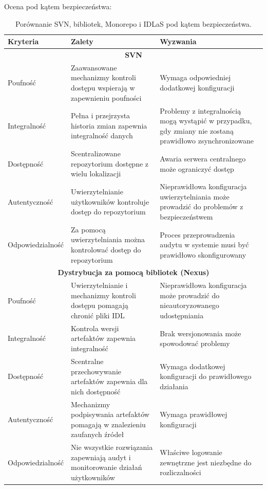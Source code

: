 \documentclass[runningheads,12pt]{llncs}
\begin{document}
Ocena pod kątem bezpieczeństwa:
\begin{longtable}{|p{4cm}|p{4cm}|p{4cm}|}
    \caption{Porównanie SVN, bibliotek, Monorepo i IDLaS pod kątem bezpieczeństwa.} \\ 
    \hline
    \textbf{Kryteria} & \textbf{Zalety} & \textbf{Wyzwania} \\ \hline
    \multicolumn{3}{|c|}{\textbf{SVN }} \\ \hline
    Poufność & Zaawansowane mechanizmy kontroli dostępu wspierają w zapewnieniu poufności & Wymaga odpowiedniej dodatkowej konfiguracji \\ \hline
    Integralność & Pełna i przejrzysta historia zmian zapewnia integralność danych & Problemy z integralnością mogą wystąpić w przypadku, gdy zmiany nie zostaną prawidłowo zsynchronizowane \\ \hline
    Dostępność & Scentralizowane repozytorium dostępne z wielu lokalizacji & Awaria serwera centralnego może ograniczyć dostęp \\ \hline
    Autentyczność & Uwierzytelnianie użytkowników kontroluje dostęp do repozytorium & Nieprawidłowa konfiguracja uwierzytelniania może prowadzić do problemów z bezpieczeństwem \\ \hline
    Odpowiedzialność & Za pomocą uwierzytelniania można kontrolować dostęp do repozytorium & Proces przeprowadzenia audytu w systemie musi być prawidłowo skonfigurowany \\ \hline
    \multicolumn{3}{|c|}{\textbf{Dystrybucja za pomocą bibliotek (Nexus)}} \\ \hline
    Poufność & Uwierzytelnianie i mechanizmy kontroli dostępu pomagają chronić pliki IDL & Nieprawidłowa konfiguracja może prowadzić do nieautoryzowanego udostępniania \\ \hline
    Integralność & Kontrola wersji artefaktów zapewnia integralność & Brak wersjonowania może spowodować problemy \\ \hline
    Dostępność & Scentralne przechowywanie artefaktów zapewnia dla nich dostępność & Wymaga dodatkowej konfiguracji do prawidłowego działania \\ \hline
    Autentyczność & Mechanizmy podpisywania artefaktów pomagają w znalezieniu zaufanych źródeł & Wymaga prawidłowej konfiguracji \\ \hline
    Odpowiedzialność & Nie wszystkie rozwiązania zapewniają audyt i monitorowanie działań użytkowników & Właściwe logowanie zewnętrzne jest niezbędne do rozliczalności \\ \hline

\end{longtable}
\end{document}
